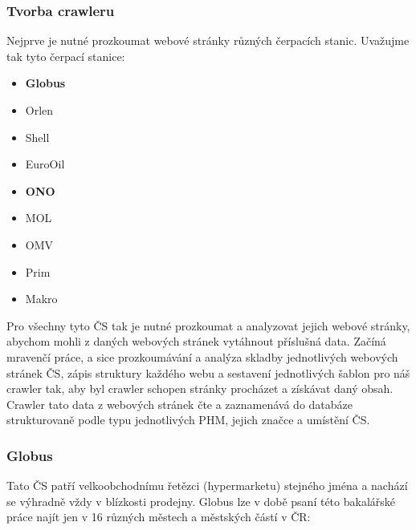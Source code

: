 \subsubsection{Tvorba crawleru}
\label{sec:crawler-preps}

Nejprve je nutné prozkoumat webové stránky různých čerpacích stanic.
Uvažujme tak tyto čerpací stanice:

\begin{itemize}
    \item \textbf{Globus}
    \item Orlen
    \item Shell
    \item EuroOil
    \item \textbf{ONO}
    \item MOL
    \item OMV
    \item Prim
    \item Makro
\end{itemize}

Pro všechny tyto ČS tak je nutné prozkoumat a analyzovat jejich webové
stránky, abychom mohli z daných webových stránek vytáhnout příslušná data.
Začíná mravenčí práce, a sice prozkoumávání a analýza skladby jednotlivých
webových stránek ČS, zápis struktury každého webu a sestavení jednotlivých
šablon pro náš crawler tak, aby byl crawler schopen stránky procházet
a získávat daný obsah. Crawler tato data z webových stránek čte a zaznamenává
do databáze strukturovaně podle typu jednotlivých PHM, jejich značce
a umístění ČS.

\subsubsection{Globus}
\label{sec:preps-globus}

Tato ČS patří velkoobchodnímu řetězci (hypermarketu) stejného jména
a nachází se výhradně vždy v blízkosti prodejny. Globus lze v době
psaní této bakalářské práce najít jen v 16 různých městech a městských
částí v ČR:

